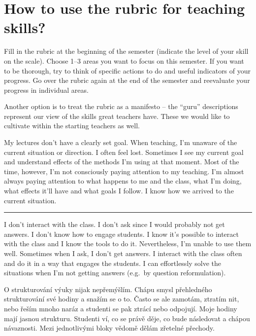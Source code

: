 \section*{How to use the rubric for teaching skills?}

Fill in the rubric at the beginning of the semester (indicate the level of your skill on the scale). Choose 1--3 areas you want to focus on this semester. If you want to be thorough, try to think of specific actions to do and useful indicators of your progress. Go over the rubric again at the end of the semester and reevaluate your progress in individual areas.

Another option is to treat the rubric as a manifesto -- the \enquote{guru} descriptions represent our view of the skills great teachers have. These we would like to cultivate within the starting teachers as well.


\newpage
{}
{My lectures don't have a clearly set goal. When teaching, I'm unaware of the current situation or direction. I often feel lost.}
{Sometimes I see my current goal and understand effects of the methods I'm using at that moment. Most of the time, however, I'm not consciously paying attention to my teaching.}
{I'm almost always paying attention to what happens to me and the class, what I'm doing, what effects it'll have and what goals I follow. I know how we arrived to the current situation.}

\rule{\textwidth}{0.4pt}
{I don't interact with the class. I don't ask since I would probably not get answers. I don't know how to engage students.}
{I know it's possible to interact with the class and I know the tools to do it. Nevertheless, I'm unable to use them well. Sometimes when I ask, I don't get answers.}
{I interact with the class often and do it in a way that engages the students. I can effortlessly solve the situations when I'm not getting answers (e.g.\ by question reformulation).}

\newpage
{}
{O strukturování výuky nijak nepřemýšlím.}
{Chápu smysl přehledného strukturování své hodiny a snažím se o to. Často se ale zamotám, ztratím nit, nebo řeším mnoho naráz a studenti se pak ztrácí nebo odpojují.}
{Moje hodiny mají jasnou strukturu. Studenti ví, co se právě děje, co bude následovat a chápou návaznosti. Mezi jednotlivými bloky vědomě dělám zřetelné přechody.}

